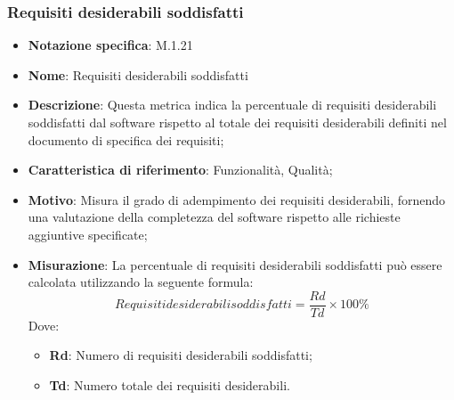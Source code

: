 \subsubsection{Requisiti desiderabili soddisfatti}
\begin{itemize}
    \item \textbf{Notazione specifica}: M.1.21
    \item \textbf{Nome}: Requisiti desiderabili soddisfatti
    \item \textbf{Descrizione}: Questa metrica indica la percentuale di requisiti desiderabili soddisfatti dal software rispetto al totale dei requisiti desiderabili definiti nel documento di specifica dei requisiti;
    \item \textbf{Caratteristica di riferimento}: Funzionalità, Qualità;
    \item \textbf{Motivo}: Misura il grado di adempimento dei requisiti desiderabili, fornendo una valutazione della completezza del software rispetto alle richieste aggiuntive specificate;
    \item \textbf{Misurazione}: La percentuale di requisiti desiderabili soddisfatti può essere calcolata utilizzando la seguente formula:
    \[ Requisiti desiderabili soddisfatti = \frac{Rd}{Td} \times 100\% \]
    Dove:
    \begin{itemize}
        \item \textbf{Rd}: Numero di requisiti desiderabili soddisfatti;
        \item \textbf{Td}: Numero totale dei requisiti desiderabili.
    \end{itemize}
\end{itemize}
